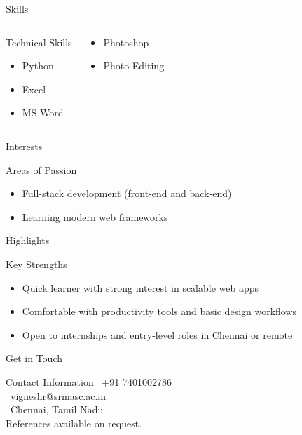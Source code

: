 \documentclass[10pt]{beamer}
\begin{document}
\begin{frame}{Skills}
    \begin{columns}
        \begin{block}{Technical Skills}
            \begin{itemize}
                \item Python
                \item Excel
                \item MS Word
            \end{itemize}
        \end{block}
        \begin{block}{}
            \begin{itemize}
                \item Photoshop
                \item Photo Editing
            \end{itemize}
        \end{block}
    \end{columns}
\end{frame}

\begin{frame}{Interests}
    \begin{block}{Areas of Passion}
        \begin{itemize}
            \item Full-stack development (front-end and back-end)
            \item Learning modern web frameworks
        \end{itemize}
    \end{block}
\end{frame}

\begin{frame}{Highlights}
    \begin{block}{Key Strengths}
        \begin{itemize}
            \item Quick learner with strong interest in scalable web apps
            \item Comfortable with productivity tools and basic design workflows
            \item Open to internships and entry-level roles in Chennai or remote
        \end{itemize}
    \end{block}
\end{frame}

\begin{frame}{Get in Touch}
    \centering
    \begin{block}{Contact Information}
        \faPhone\ +91 7401002786 \\
        \faEnvelope\ \href{mailto:vigneshr@srmasc.ac.in}{vigneshr@srmasc.ac.in} \\
        \faMapMarker\ Chennai, Tamil Nadu \\
        \vspace{0.5cm}
        \small References available on request.
    \end{block}
\end{frame}
\end{document}
